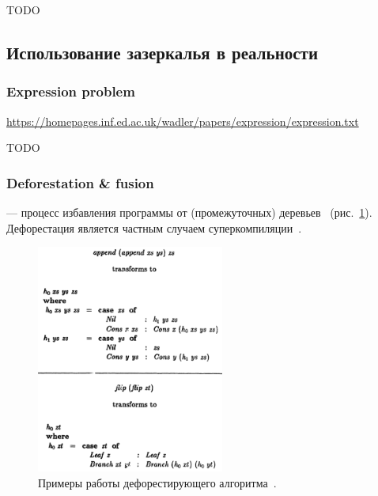 TODO %


\subsection{Использование зазеркалья в реальности}

\subsubsection{Expression problem}

\url{https://homepages.inf.ed.ac.uk/wadler/papers/expression/expression.txt}



TODO %

\subsubsection{Deforestation \& fusion}

 --- процесс избавления программы от (промежуточных) деревьев~\cite{wadler1988deforestation} (рис.~\ref{fig:deforestation-examples}).
Дефорестация является частным случаем суперкомпиляции~\cite{supercomp}.

\begin{figure}
    \centering
    \includegraphics[width=0.55\textwidth]{figs/deforestation-examples}
    \caption{Примеры работы дефорестирующего алгоритма~\cite{wadler1988deforestation}.}
    \label{fig:deforestation-examples}
\end{figure}

